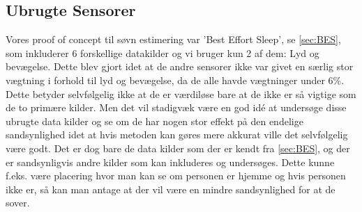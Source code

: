 \subsection{Ubrugte Sensorer}
Vores proof of concept til søvn estimering var 'Best Effort Sleep', se \cref{sec:BES}, som inkluderer 6 forskellige datakilder og vi bruger kun 2 af dem: Lyd og bevægelse. 
Dette blev gjort idet at de andre sensorer ikke var givet en særlig stor vægtning i forhold til lyd og bevægelse, da de alle havde vægtninger under 6\%. 
Dette betyder selvfølgelig ikke at de er værdiløse bare at de ikke er så vigtige som de to primære kilder.
Men det vil stadigvæk være en god idé at undersøge disse ubrugte data kilder og se om de har nogen stor effekt på den endelige sandsynlighed idet at hvis metoden kan gøres mere akkurat ville det selvfølgelig være godt. 
Det er dog bare de data kilder som der er kendt fra \cref{sec:BES}, og der er sandsynligvis andre kilder som kan inkluderes og undersøges.
Dette kunne f.eks. være placering hvor man kan se om personen er hjemme og hvis personen ikke er, så kan man antage at der vil være en mindre sandsynlighed for at de sover. 